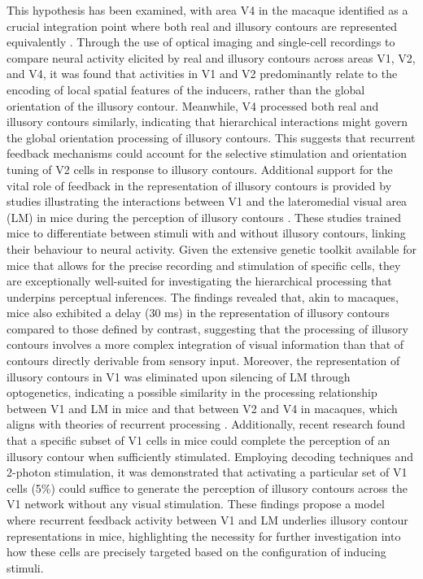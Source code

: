 \documentclass[12pt]{article}
\begin{document}
This hypothesis has been examined, with area V4 in the macaque identified as a crucial integration point where both real and illusory contours are represented equivalently \autocite{panEquivalentRepresentationReal2012}. Through the use of optical imaging and single-cell recordings to compare neural activity elicited by real and illusory contours across areas V1, V2, and V4, it was found that activities in V1 and V2 predominantly relate to the encoding of local spatial features of the inducers, rather than the global orientation of the illusory contour. Meanwhile, V4 processed both real and illusory contours similarly, indicating that hierarchical interactions might govern the global orientation processing of illusory contours. This suggests that recurrent feedback mechanisms could account for the selective stimulation and orientation tuning of V2 cells in response to illusory contours. Additional support for the vital role of feedback in the representation of illusory contours is provided by studies illustrating the interactions between V1 and the lateromedial visual area (LM) in mice during the perception of illusory contours \autocite{pakTopDownFeedbackControls2020}. These studies trained mice to differentiate between stimuli with and without illusory contours, linking their behaviour to neural activity. Given the extensive genetic toolkit available for mice that allows for the precise recording and stimulation of specific cells, they are exceptionally well-suited for investigating the hierarchical processing that underpins perceptual inferences. The findings revealed that, akin to macaques, mice also exhibited a delay (30 ms) in the representation of illusory contours compared to those defined by contrast, suggesting that the processing of illusory contours involves a more complex integration of visual information than that of contours directly derivable from sensory input. Moreover, the representation of illusory contours in V1 was eliminated upon silencing of LM through optogenetics, indicating a possible similarity in the processing relationship between V1 and LM in mice and that between V2 and V4 in macaques, which aligns with theories of recurrent processing \autocite{wyatteEarlyRecurrentFeedback2014}. Additionally, recent research \cite{shinRecurrentPatternCompletion2023} found that a specific subset of V1 cells in mice could complete the perception of an illusory contour when sufficiently stimulated. Employing decoding techniques and 2-photon stimulation, it was demonstrated that activating a particular set of V1 cells (5\%) could suffice to generate the perception of illusory contours across the V1 network without any visual stimulation. These findings propose a model where recurrent feedback activity between V1 and LM underlies illusory contour representations in mice, highlighting the necessity for further investigation into how these cells are precisely targeted based on the configuration of inducing stimuli.
\end{document}
